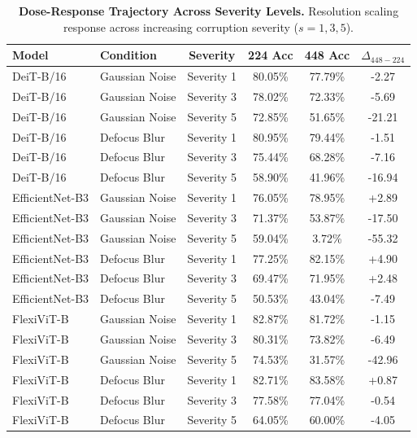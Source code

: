\begin{table}[t]
\centering
\small
\caption{\textbf{Dose-Response Trajectory Across Severity Levels.}
Resolution scaling response across increasing corruption severity ($s=1, 3, 5$).}
\label{tab:dose_response}
\begin{tabular}{llcccc}
\toprule
\textbf{Model} & \textbf{Condition} & \textbf{Severity} & \textbf{224 Acc} & \textbf{448 Acc} & $\Delta_{448 - 224}$ \\
\midrule
DeiT-B/16 & Gaussian Noise & Severity 1 & 80.05\% & 77.79\% & -2.27 \\
DeiT-B/16 & Gaussian Noise & Severity 3 & 78.02\% & 72.33\% & -5.69 \\
DeiT-B/16 & Gaussian Noise & Severity 5 & 72.85\% & 51.65\% & -21.21 \\
DeiT-B/16 & Defocus Blur & Severity 1 & 80.95\% & 79.44\% & -1.51 \\
DeiT-B/16 & Defocus Blur & Severity 3 & 75.44\% & 68.28\% & -7.16 \\
DeiT-B/16 & Defocus Blur & Severity 5 & 58.90\% & 41.96\% & -16.94 \\
EfficientNet-B3 & Gaussian Noise & Severity 1 & 76.05\% & 78.95\% & +2.89 \\
EfficientNet-B3 & Gaussian Noise & Severity 3 & 71.37\% & 53.87\% & -17.50 \\
EfficientNet-B3 & Gaussian Noise & Severity 5 & 59.04\% & 3.72\% & -55.32 \\
EfficientNet-B3 & Defocus Blur & Severity 1 & 77.25\% & 82.15\% & +4.90 \\
EfficientNet-B3 & Defocus Blur & Severity 3 & 69.47\% & 71.95\% & +2.48 \\
EfficientNet-B3 & Defocus Blur & Severity 5 & 50.53\% & 43.04\% & -7.49 \\
FlexiViT-B & Gaussian Noise & Severity 1 & 82.87\% & 81.72\% & -1.15 \\
FlexiViT-B & Gaussian Noise & Severity 3 & 80.31\% & 73.82\% & -6.49 \\
FlexiViT-B & Gaussian Noise & Severity 5 & 74.53\% & 31.57\% & -42.96 \\
FlexiViT-B & Defocus Blur & Severity 1 & 82.71\% & 83.58\% & +0.87 \\
FlexiViT-B & Defocus Blur & Severity 3 & 77.58\% & 77.04\% & -0.54 \\
FlexiViT-B & Defocus Blur & Severity 5 & 64.05\% & 60.00\% & -4.05 \\
\bottomrule
\end{tabular}
\end{table}
